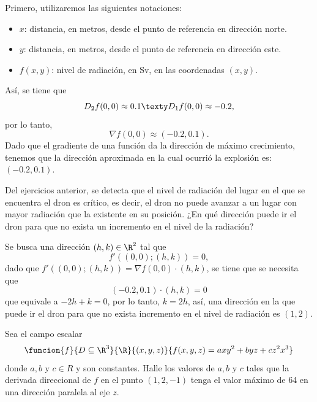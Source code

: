 \documentclass[a4,11pt]{aleph-examen}
\begin{document}
\begin{preguntas}
\begin{respuesta}
\begin{respuesta}
\begin{respuesta}
    Primero, utilizaremos las siguientes notaciones:
    \begin{itemize}
        \item $x$: distancia, en metros, desde el punto de referencia en dirección norte.
        \item $y$: distancia, en metros, desde el punto de referencia en dirección este.
        \item $f(x,y)$: nivel de radiación, en Sv, en las coordenadas $(x,y)$.
    \end{itemize}
    Así, se tiene que 
    \[
        D_2f(0,0)\approx 0.1
        \texty
        D_1f(0,0)\approx -0.2,
    \]
    por lo tanto,
    \[
        \nabla f(0,0)\approx (-0.2,0.1).
    \]
    Dado que el gradiente de una función da la dirección de máximo crecimiento, tenemos que la dirección aproximada en la cual ocurrió la explosión es: $(-0.2,0.1)$.
\end{respuesta}

\item 
    Del ejercicios anterior, se detecta que el nivel de radiación del lugar en el que se encuentra el dron es crítico, es decir, el dron no puede avanzar a un lugar con mayor radiación que la existente en su posición. ¿En qué dirección puede ir el dron para que no exista un incremento en el nivel de la radiación?

\begin{respuesta}
    Se busca una dirección $(h,k)\in\R^2$ tal que
    \[
        f'((0,0);(h,k))=0,
    \]
    dado que $f'((0,0);(h,k))=\nabla f(0,0)\cdot (h,k)$, se tiene que se necesita que
    \[
        (-0.2,0.1)\cdot (h,k) = 0
    \]
    que equivale a $-2h+k=0$, por lo tanto, $k=2h$, así, una dirección en la que puede ir el dron para que no exista incremento en el nivel de radiación es $(1,2)$.
\end{respuesta}

\item
    Sea el campo escalar
    \[
        \funcion{f}{D\subseteq\R^3}{\R}{(x,y,z)}{f{(x,y,z)=axy^2+byz+cz^2x^3}}
    \]
    donde $a,b$ y $c\in R$ y son constantes. Halle los valores de $a,b$ y $c$ tales que la derivada direccional de $f$ en el punto $(1,2,-1)$ tenga el valor máximo de 64 en una dirección paralela al eje $z$.
    

\end{respuesta}
\end{respuesta}
\end{preguntas}
\end{document}
